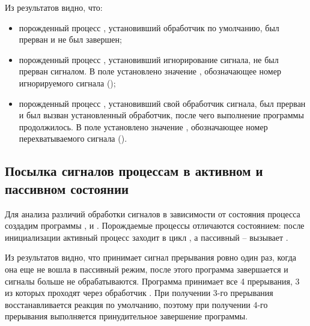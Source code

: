 



Из результатов видно, что:
\begin{itemize}
	\item порожденный процесс , установивший обработчик по умолчанию, был прерван и не был завершен;
	\item порожденный процесс , установивший игнорирование сигнала, не был прерван сигналом. В поле  установлено значение , обозначающее номер игнорируемого сигнала ();
	\item порожденный процесс , установивший свой обработчик сигнала, был прерван и был вызван установленный обработчик, после чего выполнение программы продолжилось. В поле  установлено значение , обозначающее номер перехватываемого сигнала ().
\end{itemize}

\subsection{Посылка сигналов процессам в активном и пассивном состоянии}

Для анализа различий обработки сигналов в зависимости от состояния процесса создадим программы ,  и . Порождаемые процессы отличаются состоянием: после инициализации активный процесс заходит в цикл , а пассивный -- вызывает . 









Из результатов видно, что  принимает сигнал прерывания ровно один раз, когда она еще не вошла в пассивный режим, после этого программа завершается и сигналы  больше не обрабатываются. Программа  принимает все 4 прерывания, 3 из которых проходят через обработчик . При получении 3-го прерывания восстанавливается реакция по умолчанию, поэтому при получении 4-го прерывания выполняется принудительное завершение программы.

